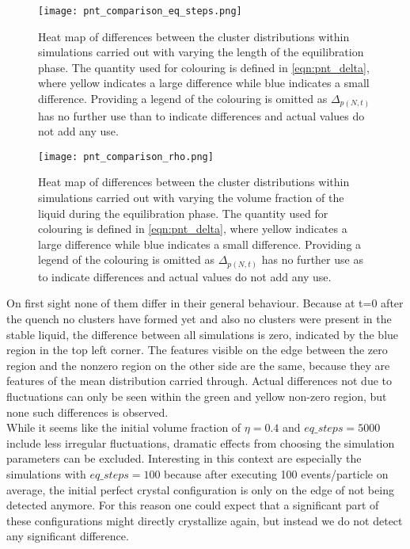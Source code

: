 \begin{figure}[h!]
\centering
\texttt{[image: pnt\_comparison\_eq\_steps.png]}
\caption[Heat maps of differences under variation of equilibration step number]{Heat map of differences between the cluster distributions within simulations carried out with varying the length of the equilibration phase. The quantity used for colouring is defined in \autoref{eqn:pnt_delta}, where yellow indicates a large difference while blue indicates a small difference. Providing a legend of the colouring is omitted as $\Delta_{p(N,t)}$ has no further use than to indicate differences and actual values do not add any use.}
\label{fig:pnt_eq_step_comparison}
\end{figure}


\begin{figure}[h!]
\centering
\texttt{[image: pnt\_comparison\_rho.png]}
\caption[Heat maps of differences under variation of initial density]{Heat map of differences between the cluster distributions within simulations carried out with varying the volume fraction of the liquid during the equilibration phase. The quantity used for colouring is defined in \autoref{eqn:pnt_delta}, where yellow indicates a large difference while blue indicates a small difference. Providing a legend of the colouring is omitted as $\Delta_{p(N,t)}$ has no further use as to indicate differences and actual values do not add any use.}
\label{fig:pnt_rho_comparison}
\end{figure}

On first sight none of them differ in their general behaviour. Because at t=0 after the quench no clusters have formed yet and also no clusters were present in the stable liquid, the difference between all simulations is zero, indicated by the blue region in the top left corner. The features visible on the edge between the zero region and the nonzero region on the other side are the same, because they are features of the mean distribution carried through. Actual differences not due to fluctuations can only be seen within the green and yellow non-zero region, but none such differences is observed.\\

While it seems like the initial volume fraction of $\eta=0.4$ and $eq\_steps = 5000$ include less irregular fluctuations, dramatic effects from choosing the simulation parameters can be excluded. Interesting in this context are especially the simulations with $eq\_steps = 100$ because after executing 100 events/particle on average, the initial perfect crystal configuration is only on the edge of not being detected anymore. For this reason one could expect that a significant part of these configurations might directly crystallize again, but instead we do not detect any significant difference.\\

